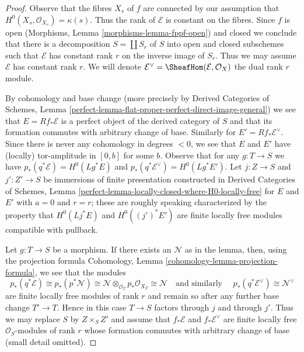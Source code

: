\begin{proof}
Observe that the fibres $X_s$ of $f$ are connected by our assumption
that $H^0(X_s, \mathcal{O}_{X_s}) = \kappa(s)$. Thus the rank of
$\mathcal{E}$ is constant on the fibres. Since $f$ is open
(Morphisms, Lemma \ref{morphisms-lemma-fppf-open}) and closed
we conclude that there is a decomposition $S = \coprod S_r$
of $S$ into open and closed subschemes such that $\mathcal{E}$
has constant rank $r$ on the inverse image of $S_r$.
Thus we may assume $\mathcal{E}$ has constant rank $r$.
We will denote $\mathcal{E}^\vee = \SheafHom(\mathcal{E}, \mathcal{O}_X)$
the dual rank $r$ module.

\medskip\noindent
By cohomology and base change (more precisely by
Derived Categories of Schemes, Lemma
\ref{perfect-lemma-flat-proper-perfect-direct-image-general})
we see that $E = Rf_*\mathcal{E}$ is a perfect object of the
derived category of $S$ and that its formation commutes with
arbitrary change of base. Similarly for $E' = Rf_*\mathcal{E}^\vee$.
Since there is never any cohomology in degrees $< 0$, we see that
$E$ and $E'$ have (locally) tor-amplitude in $[0, b]$ for some $b$.
Observe that for any $g : T \to S$ we have
$p_*(q^*\mathcal{E}) = H^0(Lg^*E)$ and
$p_*(q^*\mathcal{E}^\vee) = H^0(Lg^*E')$.
Let $j : Z \to S$ and $j' : Z' \to S$ be immersions
of finite presentation constructed in Derived Categories of Schemes, Lemma
\ref{perfect-lemma-locally-closed-where-H0-locally-free}
for $E$ and $E'$ with $a = 0$ and $r = r$; these are roughly speaking
characterized by the property that $H^0(Lj^*E)$ and $H^0((j')^*E')$
are finite locally free modules compatible with pullback.

\medskip\noindent
Let $g : T \to S$ be a morphism. If there exists an $\mathcal{N}$
as in the lemma, then, using the projection formula
Cohomology, Lemma \ref{cohomology-lemma-projection-formula},
we see that the modules
$$
p_*(q^*\mathcal{E}) \cong
p_*(p^*\mathcal{N}) \cong
\mathcal{N} \otimes_{\mathcal{O}_T} p_*\mathcal{O}_{X_T} \cong
\mathcal{N}\quad\text{and similarly }\quad
p_*(q^*\mathcal{E}^\vee) \cong \mathcal{N}^\vee
$$
are finite locally free modules of rank $r$
and remain so after any further base change $T' \to T$.
Hence in this case $T \to S$ factors through $j$ and through $j'$.
Thus we may replace $S$ by $Z \times_S Z'$ and assume that
$f_*\mathcal{E}$ and $f_*\mathcal{E}^\vee$ are finite locally free
$\mathcal{O}_S$-modules of rank $r$
whose formation commutes with arbitrary change of base
(small detail omitted).


\end{proof}
